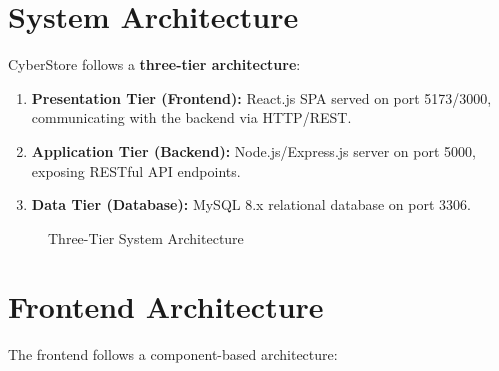 \documentclass[12pt,a4paper]{report}
\begin{document}
\section{System Architecture}
CyberStore follows a \textbf{three-tier architecture}:

\begin{enumerate}[noitemsep]
  \item \textbf{Presentation Tier (Frontend):} React.js SPA served on port 5173/3000, communicating with the backend via HTTP/REST.
  \item \textbf{Application Tier (Backend):} Node.js/Express.js server on port 5000, exposing RESTful API endpoints.
  \item \textbf{Data Tier (Database):} MySQL 8.x relational database on port 3306.
\end{enumerate}

\begin{figure}[H]
\centering
{}
\caption{Three-Tier System Architecture}
\label{fig:architecture}
\end{figure}

\section{Frontend Architecture}
The frontend follows a component-based architecture:
\end{document}
